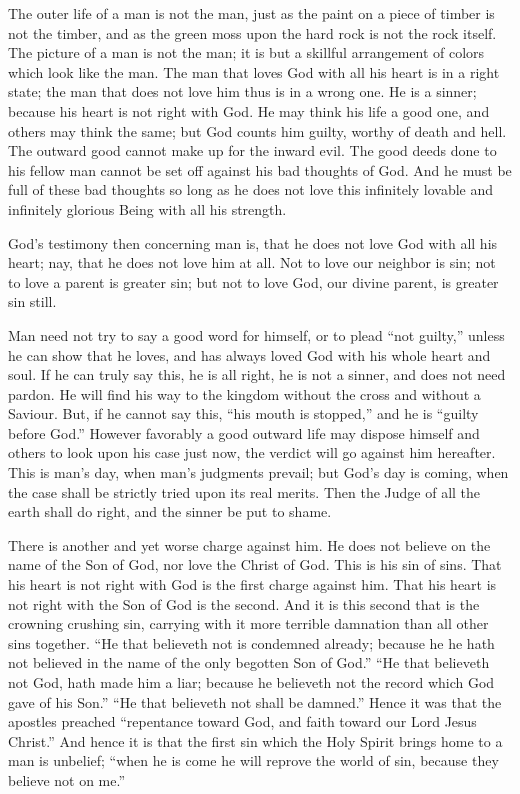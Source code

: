 \documentclass[
]{book}
\begin{document}
The outer life of a man is not the man, just as the paint on a piece of timber is not the timber, and as the green moss upon the hard rock is not the rock itself. The picture of a man is not the man; it is but a skillful arrangement of colors which look like the man. The man that loves God with all his heart is in a right state; the man that does not love him thus is in a wrong one. He is a sinner; because his heart is not right with God. He may think his life a good one, and others may think the same; but God counts him guilty, worthy of death and hell. The outward good cannot make up for the inward evil. The good deeds done to his fellow man cannot be set off against his bad thoughts of God. And he must be full of these bad thoughts so long as he does not love this infinitely lovable and infinitely glorious Being with all his strength.

God's testimony then concerning man is, that he does not love God with all his heart; nay, that he does not love him at all. Not to love our neighbor is sin; not to love a parent is greater sin; but not to love God, our divine parent, is greater sin still.

Man need not try to say a good word for himself, or to plead ``not guilty,'' unless he can show that he loves, and has always loved God with his whole heart and soul. If he can truly say this, he is all right, he is not a sinner, and does not need pardon. He will find his way to the kingdom without the cross and without a Saviour. But, if he cannot say this, ``his mouth is stopped,'' and he is ``guilty before God.'' However favorably a good outward life may dispose himself and others to look upon his case just now, the verdict will go against him hereafter. This is man's day, when man's judgments prevail; but God's day is coming, when the case shall be strictly tried upon its real merits. Then the Judge of all the earth shall do right, and the sinner be put to shame.

There is another and yet worse charge against him. He does not believe on the name of the Son of God, nor love the Christ of God. This is his sin of sins. That his heart is not right with God is the first charge against him. That his heart is not right with the Son of God is the second. And it is this second that is the crowning crushing sin, carrying with it more terrible damnation than all other sins together. ``He that believeth not is condemned already; because he he hath not believed in the name of the only begotten Son of God.'' ``He that believeth not God, hath made him a liar; because he believeth not the record which God gave of his Son.'' ``He that believeth not shall be damned.'' Hence it was that the apostles preached ``repentance toward God, and faith toward our Lord Jesus Christ.'' And hence it is that the first sin which the Holy Spirit brings home to a man is unbelief; ``when he is come he will reprove the world of sin, because they believe not on me.''
\end{document}
